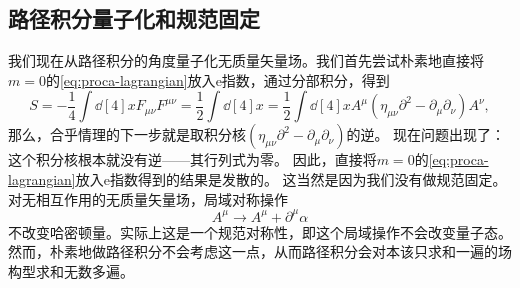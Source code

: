 \documentclass[hyperref, UTF8, a4paper]{ctexart}
\newcommand*{\ee}{\mathrm{e}}
\begin{document}
\subsection{路径积分量子化和规范固定}

我们现在从路径积分的角度量子化无质量矢量场。我们首先尝试朴素地直接将$m=0$的\eqref{eq:proca-lagrangian}放入$\ee$指数，通过分部积分，得到
\begin{equation}
    S = - \frac{1}{4} \int \dd[4]{x} F_{\mu \nu} F^{\mu \nu} = \frac{1}{2} \int \dd[4]{x} = \frac{1}{2} \int \dd[4]{x} A^\mu (\eta_{\mu \nu} \partial^2 - \partial_\mu \partial_\nu) A^\nu,
\end{equation}
那么，合乎情理的下一步就是取积分核$(\eta_{\mu \nu} \partial^2 - \partial_\mu \partial_\nu)$的逆。
现在问题出现了：这个积分核根本就没有逆——其行列式为零。
因此，直接将$m=0$的\eqref{eq:proca-lagrangian}放入$\ee$指数得到的结果是发散的。
这当然是因为我们没有做规范固定。对无相互作用的无质量矢量场，局域对称操作
\[
    A^\mu \longrightarrow A^\mu + \partial^\mu \alpha
\]
不改变哈密顿量。实际上这是一个规范对称性，即这个局域操作不会改变量子态。然而，朴素地做路径积分不会考虑这一点，从而路径积分会对本该只求和一遍的场构型求和无数多遍。
\end{document}
